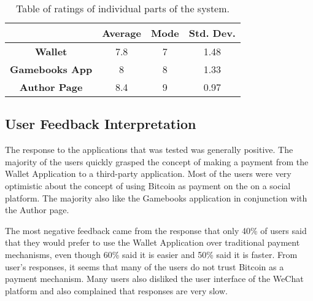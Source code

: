 \begin{table}
	\begin{center}
		\caption{Table of ratings of individual parts of the system.} 
		\begin{tabular}	{ | c| c | c | c|}
		\hline
		 &\textbf{Average} & \textbf{Mode} & \textbf{Std. Dev.} \\ \hline
		 \textbf{Wallet} & 7.8 & 7 & 1.48 \\ \hline
		 \textbf{Gamebooks App} & 8 & 8 & 1.33\\ \hline
		 \textbf{Author Page} & 8.4 & 9 & 0.97\\ \hline

		
		
		\end{tabular}
		
		\label{tbl:ratings}
	\end{center}
\end{table}


\subsection{User Feedback Interpretation}

The response to the applications that was tested was generally positive. The majority of the users quickly grasped the concept of making a payment from the Wallet Application to a third-party application. Most of the users were very optimistic about the concept of using Bitcoin as payment on the on a social platform. The majority also like the Gamebooks application in conjunction with the Author page. 

The most negative feedback came from the response that only 40\% of users said that they would prefer to use the Wallet Application over traditional payment mechanisms, even though 60\% said it is easier and 50\% said it is faster. From user's responses, it seems that many of the users do not trust Bitcoin as a payment mechanism. Many users also disliked the user interface of the WeChat platform and also complained that responses are very slow.




